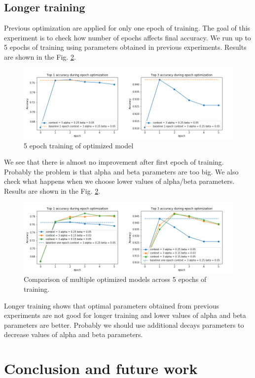 \documentclass{llncs}
\begin{document}
\subsection{Longer training}
Previous optimization are applied for only one epoch of training. The goal of this experiment is to check how number of epochs affects final accuracy. We run up to 5 epochs of training using parameters obtained in previous experiments. Results are shown in the Fig. \ref{fig:exp4_2}.
\begin{figure}
    \label{fig:exp4_1}
    \caption{5 epoch training of optimized model}
    \includegraphics[scale=0.6]{res/exp4_epoch_top_acc.png}
\end{figure}
We see that there is almost no improvement after first epoch of training. Probably the problem is that alpha and beta parameters are too big. We also check what happens when we choose lower values of alpha/beta parameters. Results are shown in the Fig. \ref{fig:exp4_2}.
\begin{figure}
    \label{fig:exp4_2}
    \caption{Comparison of multiple optimized models across 5 epochs of training. }
    \includegraphics[scale=0.6]{res/exp4_epoch_multiconfiguration_top_acc.png}
\end{figure}
Longer training shows that optimal parameters obtained from previous experiments are not good for longer training and lower values of alpha and beta parameters are better. Probably we should use additional decays parameters to decrease values of alpha and beta parameters.

\section{Conclusion and future work}
\end{document}
